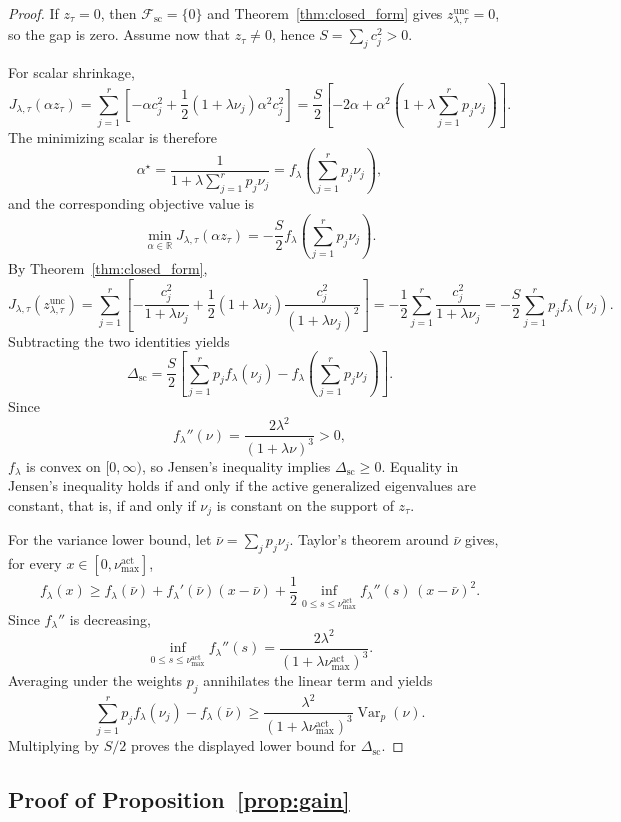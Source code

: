\documentclass{article}
\newcommand{\RR}{\mathbb{R}}
\newcommand{\Var}{\operatorname{Var}}
\newcommand{\paren}[1]{\left( #1 \right)}
\newcommand{\bracks}[1]{\left[ #1 \right]}
\begin{document}
\begin{proof}
If \(z_\tau=0\), then \(\mathcal F_{\mathrm{sc}}=\{0\}\) and Theorem~\ref{thm:closed_form} gives \(z_{\lambda,\tau}^{\mathrm{unc}}=0\), so the gap is zero. Assume now that \(z_\tau\neq 0\), hence \(S=\sum_j c_j^2>0\).

For scalar shrinkage,
\[
J_{\lambda,\tau}(\alpha z_\tau)
=
\sum_{j=1}^r\bracks{-\alpha c_j^2 + \frac12 (1+\lambda\nu_j)\alpha^2 c_j^2}
=
\frac{S}{2}\bracks{-2\alpha + \alpha^2\paren{1+\lambda\sum_{j=1}^r p_j\nu_j}}.
\]
The minimizing scalar is therefore
\[
\alpha^\star
=
\frac{1}{1+\lambda\sum_{j=1}^r p_j\nu_j}
=
f_\lambda\!\paren{\sum_{j=1}^r p_j\nu_j},
\]
and the corresponding objective value is
\[
\min_{\alpha\in\RR}J_{\lambda,\tau}(\alpha z_\tau)
=
-\frac{S}{2}
f_\lambda\!\paren{\sum_{j=1}^r p_j\nu_j}.
\]
By Theorem~\ref{thm:closed_form},
\[
J_{\lambda,\tau}(z_{\lambda,\tau}^{\mathrm{unc}})
=
\sum_{j=1}^r\bracks{
-\frac{c_j^2}{1+\lambda\nu_j}
+
\frac12 (1+\lambda\nu_j)\frac{c_j^2}{(1+\lambda\nu_j)^2}
}
=
-\frac12\sum_{j=1}^r \frac{c_j^2}{1+\lambda\nu_j}
=
-\frac{S}{2}\sum_{j=1}^r p_j f_\lambda(\nu_j).
\]
Subtracting the two identities yields
\[
\Delta_{\mathrm{sc}}
=
\frac{S}{2}
\bracks{
\sum_{j=1}^r p_j f_\lambda(\nu_j)
-
f_\lambda\!\paren{\sum_{j=1}^r p_j\nu_j}
}.
\]
Since
\[
f_\lambda''(\nu)=\frac{2\lambda^2}{(1+\lambda\nu)^3}>0,
\]
\(f_\lambda\) is convex on \([0,\infty)\), so Jensen's inequality implies \(\Delta_{\mathrm{sc}}\ge 0\). Equality in Jensen's inequality holds if and only if the active generalized eigenvalues are constant, that is, if and only if \(\nu_j\) is constant on the support of \(z_\tau\).

For the variance lower bound, let \(\bar\nu=\sum_j p_j\nu_j\). Taylor's theorem around \(\bar\nu\) gives, for every \(x\in[0,\nu_{\max}^{\mathrm{act}}]\),
\[
f_\lambda(x)
\ge
f_\lambda(\bar\nu)
+
f_\lambda'(\bar\nu)(x-\bar\nu)
+
\frac12 \inf_{0\le s\le \nu_{\max}^{\mathrm{act}}} f_\lambda''(s)\,(x-\bar\nu)^2.
\]
Since \(f_\lambda''\) is decreasing,
\[
\inf_{0\le s\le \nu_{\max}^{\mathrm{act}}} f_\lambda''(s)
=
\frac{2\lambda^2}{(1+\lambda\nu_{\max}^{\mathrm{act}})^3}.
\]
Averaging under the weights \(p_j\) annihilates the linear term and yields
\[
\sum_{j=1}^r p_j f_\lambda(\nu_j) - f_\lambda(\bar\nu)
\ge
\frac{\lambda^2}{(1+\lambda\nu_{\max}^{\mathrm{act}})^3}\Var_p(\nu).
\]
Multiplying by \(S/2\) proves the displayed lower bound for \(\Delta_{\mathrm{sc}}\).
\end{proof}

\subsection{Proof of Proposition~\ref{prop:gain}}
\end{document}
